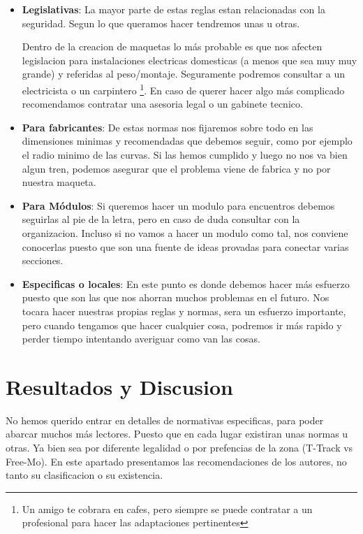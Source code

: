 \begin{itemize}
	\item \textbf{Legislativas}: La mayor parte de estas reglas estan relacionadas con la seguridad. Segun lo que queramos hacer tendremos unas u otras.  

Dentro de la creacion de maquetas lo más probable es que nos afecten legislacion para instalaciones electricas domesticas (a menos que sea muy muy grande) y referidas al peso/montaje. Seguramente podremos consultar a un electricista o un carpintero \footnote{Un amigo te cobrara en cafes, pero siempre se puede contratar a un profesional para hacer las adaptaciones pertinentes}. En caso de querer hacer algo más complicado recomendamos contratar una asesoria legal o un gabinete tecnico.  
	\item \textbf{Para fabricantes}: De estas normas nos fijaremos sobre todo en las dimensiones minimas y recomendadas que debemos seguir, como por ejemplo el radio minimo de las curvas. Si las hemos cumplido y luego no nos va bien algun tren, podemos asegurar que el problema viene de fabrica y no por nuestra maqueta.
	\item \textbf{Para Módulos}: Si queremos hacer un modulo para encuentros debemos seguirlas al pie de la letra, pero en caso de duda consultar con la organizacion. Incluso si no vamos a hacer un modulo como tal, nos conviene conocerlas puesto que son una fuente de ideas provadas para conectar varias secciones. 
	\item \textbf{Especificas o locales}: En este punto es donde debemos hacer más esfuerzo puesto que son las que nos ahorran muchos problemas en el futuro. Nos tocara hacer nuestras propias reglas y normas, sera un esfuerzo importante, pero cuando tengamos que hacer cualquier cosa, podremos ir más rapido y perder tiempo intentando averiguar como van las cosas.
\end{itemize}

\section{Resultados y Discusion} 
No hemos querido entrar en detalles de normativas especificas, para poder abarcar muchos más lectores. Puesto que en cada lugar existiran unas normas u otras. Ya bien sea por diferente legalidad o por prefencias de la zona (T-Track vs Free-Mo).
En este apartado presentamos las recomendaciones de los autores, no tanto su clasificacion o su existencia.

